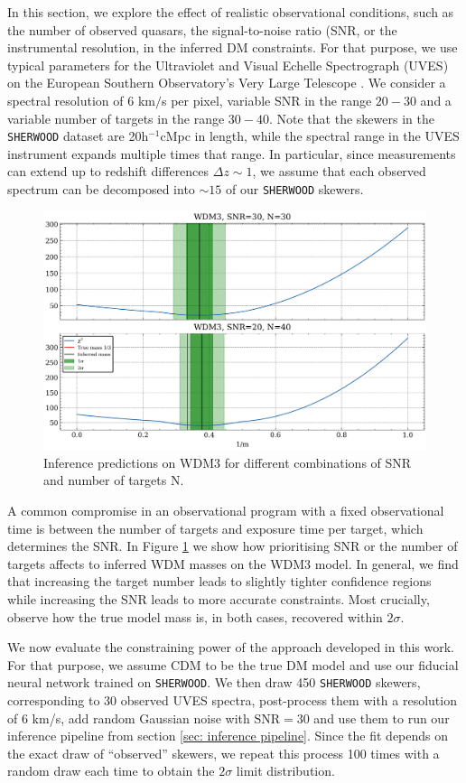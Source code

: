 In this section, we explore the effect of realistic observational conditions, such as the number of observed quasars, the signal-to-noise ratio (SNR, or the instrumental resolution, in the inferred DM constraints. For that purpose, we use typical parameters for the Ultraviolet and Visual Echelle Spectrograph (UVES) on the European Southern Observatory's Very Large Telescope \cite{Murphy_2018}. We consider a spectral resolution of $6$ km$/$s per pixel, variable SNR in the range $20-30$ and a variable number of targets in the range $30-40$. Note that the skewers in the \texttt{SHERWOOD} dataset are 20h$^{-1}$cMpc in length, while the spectral range in the UVES instrument expands multiple times that range. In particular, since measurements can extend up to redshift differences $\Delta z \sim 1$, we assume that each observed spectrum can be decomposed into $\sim 15$ of our \texttt{SHERWOOD} skewers.


\begin{figure}
    \centering
    \includegraphics[width=0.8\linewidth]{img/ML/SNR_vs_N.png}
    \caption{Inference predictions on WDM3 for different combinations of SNR and number of targets N.}
    \label{fig: inference snr vs n}
\end{figure}

A common compromise in an observational program with a fixed observational time is between the number of targets and exposure time per target, which determines the SNR. In Figure \ref{fig: inference snr vs n} we show how prioritising SNR or the number of targets affects to inferred WDM masses on the WDM3 model. In general, we find that increasing the target number leads to slightly tighter confidence regions while increasing the SNR leads to more accurate constraints. Most crucially, observe how the true model mass is, in both cases, recovered within $2\sigma$.

We now evaluate the constraining power of the approach developed in this work. For that purpose, we assume CDM to be the true DM model and use our fiducial neural network trained on \texttt{SHERWOOD}. We then draw 450 \texttt{SHERWOOD} skewers, corresponding to 30 observed UVES spectra, post-process them with a resolution of 6 km/s, add random Gaussian noise with $\text{SNR}=30$ and use them to run our inference pipeline from section \ref{sec: inference pipeline}. Since the fit depends on the exact draw of ``observed'' skewers, we repeat this process 100 times with a random draw each time to obtain the $2\sigma$ limit distribution.

